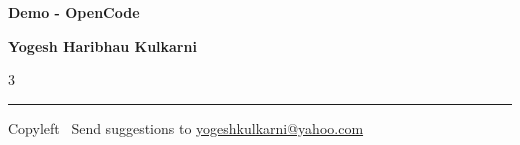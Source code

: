 
\graphicspath{{images/}}

\footnotesize


\begin{center}
{\Large{\textbf{Demo - OpenCode}}}  

\textbf{Yogesh Haribhau Kulkarni}
\end{center}

\begin{multicols}{3}

\end{multicols}

\rule{\linewidth}{0.25pt}
\scriptsize
Copyleft \textcopyleft\  Send suggestions to 
\href{http://www.yogeshkulkarni.com}{yogeshkulkarni@yahoo.com}


